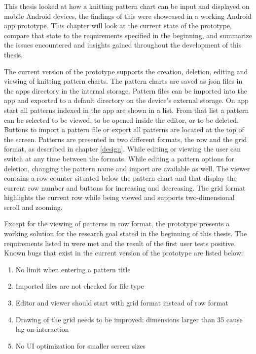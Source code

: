 This thesis looked at how a knitting pattern chart can be input and displayed on mobile Android devices, the findings of this were showcased in a working Android app prototype. This chapter will look at the current state of the prototype, compare that state to the requirements specified in the beginning, and summarize the issues encountered and insights gained throughout the development of this thesis.

The current version of the prototype supports the creation, deletion, editing and viewing of knitting pattern charts. The pattern charts are saved as \gls{json} files in the apps directory in the internal storage. Pattern files can be imported into the app and exported to a default directory on the device's external storage. On app start all patterns indexed in the app are shown in a list. From that list a pattern can be selected to be viewed, to be opened inside the editor, or to be deleted. Buttons to import a pattern file or export all patterns are located at the top of the screen. Patterns are presented in two different formats, the row and the grid format, as described in chapter \ref{design}. While editing or viewing the user can switch at any time between the formats. While editing a pattern options for deletion, changing the pattern name and import are available as well. The viewer contains a row counter situated below the pattern chart and that display the current row number and buttons for increasing and decreasing. The grid format highlights the current row while being viewed and supports two-dimensional scroll and zooming.

Except for the viewing of patterns in row format, the prototype presents a working solution for the research goal stated in the beginning of this thesis. The requirements listed in  were met and the result of the first user tests positive. Known bugs that exist in the current version of the prototype are listed below:

\begin{enumerate}
\item No limit when entering a pattern title
\item Imported files are not checked for file type
\item Editor and viewer should start with grid format instead of row format
\item Drawing of the grid needs to be improved: dimensions larger than 35 cause lag on interaction
\item No \gls{UI} optimization for smaller screen sizes
\end{enumerate}

